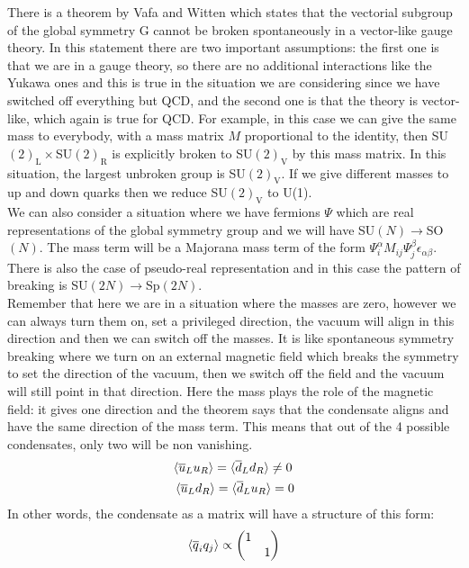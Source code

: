 \documentclass[../main.tex]{subfiles}
\begin{document}
There is a theorem by Vafa and Witten which states that the vectorial subgroup of the global symmetry G cannot be broken spontaneously in a vector-like gauge theory. In this statement there are two important assumptions: the first one is that we are in a gauge theory, so there are no additional interactions like the Yukawa ones and this is true in the situation we are considering since we have switched off everything but QCD, and the second one is that the theory is vector-like, which again is true for QCD. For example, in this case we can give the same mass to everybody, with a mass matrix $M$ proportional to the identity, then SU$(2)_{\text{L}}\times$SU$(2)_{\text{R}}$ is explicitly broken to SU$(2)_{\text{V}}$ by this mass matrix. In this situation, the largest unbroken group is SU$(2)_{\text{V}}$. If we give different masses to up and down quarks then we reduce SU$(2)_{\text{V}}$ to U(1).\\
We can also consider a situation where we have fermions $\Psi$ which are real representations of the global symmetry group and we will have SU$(N)\to$SO$(N)$. The mass term will be a Majorana mass term of the form $\Psi_i^\alpha M_{ij}\Psi_j^\beta\epsilon_{\alpha\beta}$. There is also the case of pseudo-real representation and in this case the pattern of breaking is SU$(2N)\to$Sp$(2N)$.\\
Remember that here we are in a situation where the masses are zero, however we can always turn them on, set a privileged direction, the vacuum will align in this direction and then we can switch off the masses. It is like spontaneous symmetry breaking where we turn on an external magnetic field which breaks the symmetry to set the direction of the vacuum, then we switch off the field and the vacuum will still point in that direction. Here the mass plays the role of the magnetic field: it gives one direction and the theorem says that the condensate aligns and have the same direction of the mass term. This means that out of the 4 possible condensates, only two will be non vanishing.
\[
\begin{aligned}
    &\langle\overline{u}_Lu_R\rangle=\langle\overline{d}_Ld_R\rangle\neq0\\
    &\Braket{\overline{u}_Ld_R}=\langle\overline{d}_Lu_R\rangle=0
\end{aligned}
\]
In other words, the condensate as a matrix will have a structure of this form:
\[
\Braket{\overline{q}_iq_j}\propto\mqty(\dmat{1,1})
\]
\end{document}
